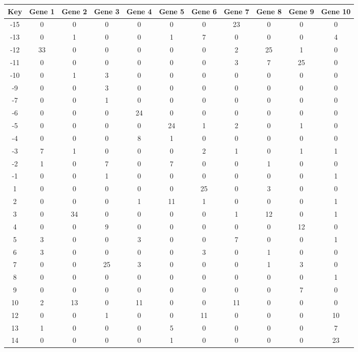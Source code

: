 \begin{tabular}{|c|c|c|c|c|c|c|c|c|c|c|}
\hline
Key & Gene 1 & Gene 2 & Gene 3 & Gene 4 & Gene 5 & Gene 6 & Gene 7 & Gene 8 & Gene 9 & Gene 10 \\
\hline
-15 & 0 & 0 & 0 & 0 & 0 & 0 & 23 & 0 & 0 & 0 \\
-13 & 0 & 1 & 0 & 0 & 1 & 7 & 0 & 0 & 0 & 4 \\
-12 & 33 & 0 & 0 & 0 & 0 & 0 & 2 & 25 & 1 & 0 \\
-11 & 0 & 0 & 0 & 0 & 0 & 0 & 3 & 7 & 25 & 0 \\
-10 & 0 & 1 & 3 & 0 & 0 & 0 & 0 & 0 & 0 & 0 \\
-9 & 0 & 0 & 3 & 0 & 0 & 0 & 0 & 0 & 0 & 0 \\
-7 & 0 & 0 & 1 & 0 & 0 & 0 & 0 & 0 & 0 & 0 \\
-6 & 0 & 0 & 0 & 24 & 0 & 0 & 0 & 0 & 0 & 0 \\
-5 & 0 & 0 & 0 & 0 & 24 & 1 & 2 & 0 & 1 & 0 \\
-4 & 0 & 0 & 0 & 8 & 1 & 0 & 0 & 0 & 0 & 0 \\
-3 & 7 & 1 & 0 & 0 & 0 & 2 & 1 & 0 & 1 & 1 \\
-2 & 1 & 0 & 7 & 0 & 7 & 0 & 0 & 1 & 0 & 0 \\
-1 & 0 & 0 & 1 & 0 & 0 & 0 & 0 & 0 & 0 & 1 \\
1 & 0 & 0 & 0 & 0 & 0 & 25 & 0 & 3 & 0 & 0 \\
2 & 0 & 0 & 0 & 1 & 11 & 1 & 0 & 0 & 0 & 1 \\
3 & 0 & 34 & 0 & 0 & 0 & 0 & 1 & 12 & 0 & 1 \\
4 & 0 & 0 & 9 & 0 & 0 & 0 & 0 & 0 & 12 & 0 \\
5 & 3 & 0 & 0 & 3 & 0 & 0 & 7 & 0 & 0 & 1 \\
6 & 3 & 0 & 0 & 0 & 0 & 3 & 0 & 1 & 0 & 0 \\
7 & 0 & 0 & 25 & 3 & 0 & 0 & 0 & 1 & 3 & 0 \\
8 & 0 & 0 & 0 & 0 & 0 & 0 & 0 & 0 & 0 & 1 \\
9 & 0 & 0 & 0 & 0 & 0 & 0 & 0 & 0 & 7 & 0 \\
10 & 2 & 13 & 0 & 11 & 0 & 0 & 11 & 0 & 0 & 0 \\
12 & 0 & 0 & 1 & 0 & 0 & 11 & 0 & 0 & 0 & 10 \\
13 & 1 & 0 & 0 & 0 & 5 & 0 & 0 & 0 & 0 & 7 \\
14 & 0 & 0 & 0 & 0 & 1 & 0 & 0 & 0 & 0 & 23 \\
\hline
\end{tabular}